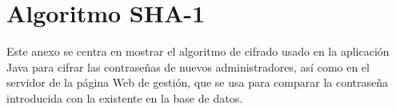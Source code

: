 \chapter{Algoritmo SHA-1}
\label{chap:sha1}
Este anexo se centra en mostrar el algoritmo de cifrado usado en la aplicación Java para cifrar las contraseñas de nuevos administradores, así como en el servidor de la página Web de gestión, que se usa para comparar la contraseña introducida con la existente en la base de datos.

